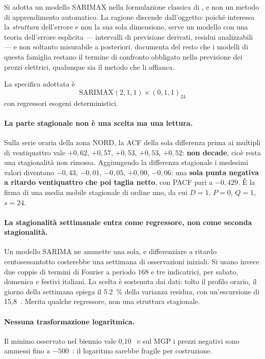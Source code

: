 Si adotta un modello \ac{SARIMAX} nella formulazione classica di
\textcite{box2015timeseries}, e non un metodo di apprendimento automatico. La ragione discende
dall'oggetto: poich\'e interessa la \emph{struttura} dell'errore e non la sua sola dimensione,
serve un modello con una teoria dell'errore esplicita --- intervalli di previsione derivati,
residui analizzabili --- e non soltanto misurabile a posteriori. \textcite{weron2014previsione}
documenta del resto che i modelli di questa famiglia restano il termine di confronto
obbligato nella previsione dei prezzi elettrici, qualunque sia il metodo che li affianca.

La specifica adottata \`e
\[
  \text{SARIMAX}(2,1,1)\times(0,1,1)_{24}
\]
con regressori esogeni deterministici.

\paragraph{La parte stagionale non \`e una scelta ma una lettura.} Sulla serie oraria della
zona NORD, la \ac{ACF} della sola differenza prima ai multipli di ventiquattro vale
$+0{,}62$, $+0{,}57$, $+0{,}53$, $+0{,}53$, $+0{,}52$: \textbf{non decade}, cio\`e resta una
stagionalit\`a non rimossa. Aggiungendo la differenza stagionale i medesimi valori diventano
$-0{,}43$, $-0{,}01$, $-0{,}05$, $+0{,}00$, $-0{,}06$: una \textbf{sola punta negativa a
ritardo ventiquattro che poi taglia netto}, con \ac{PACF} pari a $-0{,}429$. \`E la firma di
una media mobile stagionale di ordine uno, da cui $D = 1$, $P = 0$, $Q = 1$, $s = 24$.

\paragraph{La stagionalit\`a settimanale entra come regressore, non come seconda
stagionalit\`a.} Un modello SARIMA ne ammette una sola, e differenziare a ritardo
centosessantotto costerebbe una settimana di osservazioni iniziali. Si usano invece due coppie
di termini di Fourier a periodo $168$ e tre indicatrici, per sabato, domenica e festivi
italiani. La scelta \`e sostenuta dai dati: tolto il profilo orario, il giorno della settimana
spiega il \SI{5,2}{\percent} della varianza residua, con un'escursione di
15,8~\euromwh{}. Merita qualche regressore, non una struttura stagionale.

\paragraph{Nessuna trasformazione logaritmica.} Il minimo osservato nel biennio vale
0,10~\euromwh{} e sul \ac{MGP} i prezzi negativi sono ammessi fino a
$-500$~\euromwh{}: il logaritmo sarebbe fragile per costruzione.

